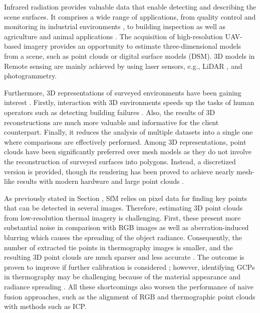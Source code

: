 Infrared radiation provides valuable data that enable detecting and describing the scene surfaces. It comprises a wide range of applications, from quality control and monitoring in industrial environments \cite{alfredo_osornio-rios_recent_2019}, to building inspection \cite{jarzabek-rychard_supervised_2020} as well as agriculture and animal applications \cite{tsouros_review_2019}. The acquisition of high-resolution UAV-based imagery provides an opportunity to estimate three-dimensional models from a scene, such as point clouds or digital surface models (DSM). 3D models in \gls{Remote sensing} are mainly achieved by using laser sensors, e.g., LiDAR \cite{yandun_narvaez_survey_2017}, and photogrammetry. 

Furthermore, 3D representations of surveyed environments have been gaining interest \cite{jurado_remote_2022}. Firstly, interaction with 3D environments speeds up the tasks of human operators such as detecting building failures \cite{lin_fusion_2019}. Also, the results of 3D reconstructions are much more valuable and informative for the client counterpart. Finally, it reduces the analysis of multiple datasets into a single one where comparisons are effectively performed. Among 3D representations, point clouds have been significantly preferred over mesh models as they do not involve the reconstruction of surveyed surfaces \cite{park_comparison_2019} into polygons. Instead, a discretized version is provided, though its rendering has been proved to achieve nearly mesh-like results with modern hardware and large point clouds \cite{schutz_rendering_2021}.   

As previously stated in Section , SfM relies on pixel data for finding key points that can be detected in several images. Therefore, estimating 3D point clouds from low-resolution thermal imagery is challenging. First, these present more substantial noise in comparison with RGB images \cite{sledz_thermal_2018} as well as aberration-induced blurring which causes the spreading of the object radiance. Consequently, the number of extracted tie points in thermography images is smaller, and the resulting 3D point clouds are much sparser and less accurate \cite{jarzabek-rychard_supervised_2020}. The outcome is proven to improve if further calibration is considered \cite{ribeiro-gomes_uncooled_2017}; however, identifying GCPs in thermography may be challenging because of the material appearance and radiance spreading \cite{javadnejad_photogrammetric_2020}. All these shortcomings also worsen the performance of naive fusion approaches, such as the alignment of RGB and thermographic point clouds with methods such as ICP. 

